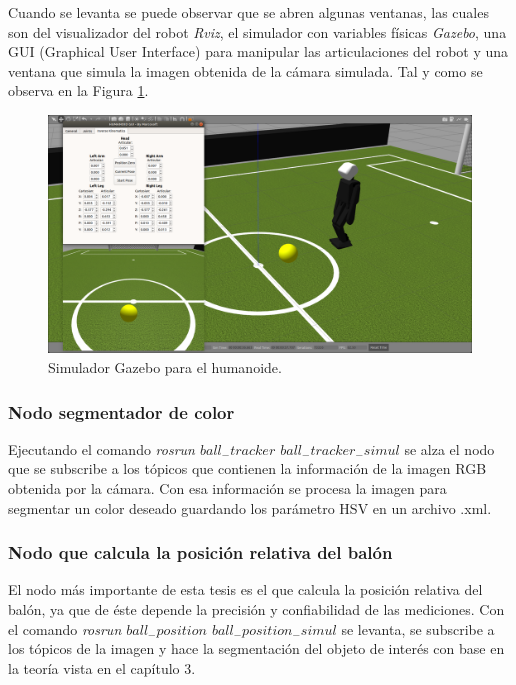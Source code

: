 		Cuando se levanta se puede observar que se abren algunas ventanas, las cuales son del visualizador del robot \textit{Rviz}, el simulador con variables físicas \textit{Gazebo}, una GUI (Graphical User Interface) para manipular las articulaciones del robot y una ventana que simula la imagen obtenida de la cámara simulada. Tal y como se observa en la Figura \ref{fig:gazebo}.
		
\begin{figure}
	\centering
	\includegraphics[scale=0.2]{images/gazebo.png}
	\caption{Simulador Gazebo para el humanoide.}
	\label{fig:gazebo}
\end{figure} 
		
			\subsubsection*{Nodo segmentador de color}
			Ejecutando el comando \textit{rosrun $ball_-tracker$ $ball_-tracker_-simul$} se alza el nodo que se subscribe a los tópicos que contienen la información de la imagen RGB obtenida por la cámara. Con esa información se procesa la imagen para segmentar un color deseado guardando los parámetro HSV en un archivo .xml.
			
			\subsubsection*{Nodo que calcula la posición relativa del balón}
			El nodo más importante de esta tesis es el que calcula la posición relativa del balón, ya que de éste depende la precisión y confiabilidad de las mediciones. Con el comando \textit{rosrun $ball_-position$ $ball_-position_-simul$} se levanta, se subscribe a los tópicos de la imagen y hace la segmentación del objeto de interés con base en la teoría vista en el capítulo 3. 
			
